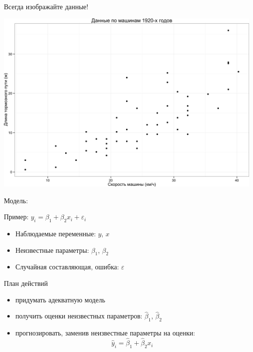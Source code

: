 \begin{frame}{Всегда изображайте данные!}

\includegraphics{lec_01_files/figure-beamer/unnamed-chunk-3-1.png}

\end{frame}

\begin{frame}{Модель:}

Пример: \(y_i=\beta_1 + \beta_2 x_i + \varepsilon_i\)

\begin{itemize}
\tightlist
\item
  Наблюдаемые переменные: \(y\), \(x\)
\item
  Неизвестные параметры: \(\beta_1\), \(\beta_2\)
\item
  Случайная составляющая, ошибка: \(\varepsilon\)
\end{itemize}

\begin{block}{План действий}

\begin{itemize}
\tightlist
\item
  придумать адекватную модель\\
\item
  получить оценки неизвестных параметров: \(\hat{\beta}_1\),
  \(\hat{\beta}_2\)\\
\item
  прогнозировать, заменив неизвестные параметры на оценки:\\
  \[
  \hat{y}_i=\hat{\beta}_1 + \hat{\beta}_2 x_i
  \]
\end{itemize}

\end{block}

\end{frame}

